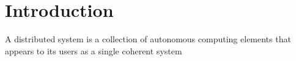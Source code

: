 \section{Introduction}

A distributed system is a collection of autonomous computing elements
that appears to its users as a single coherent system\cite{distributedsystems}
